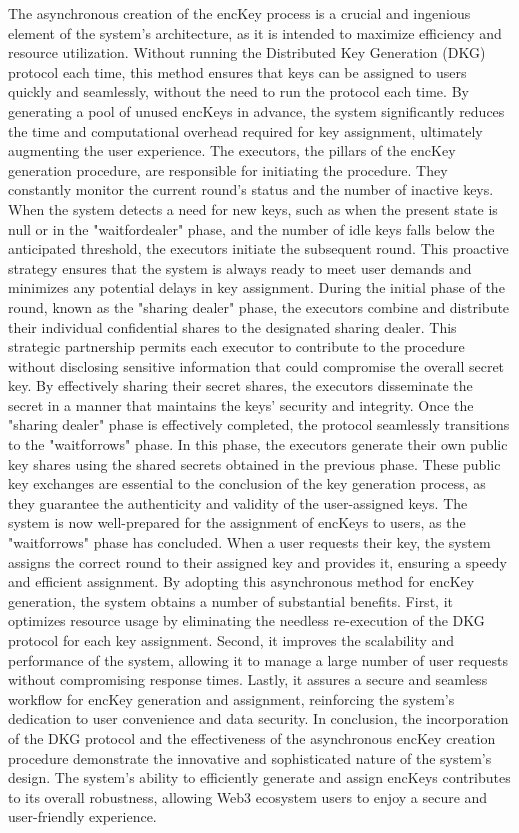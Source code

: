 \documentclass[../Main.tex]{subfiles}
\begin{document}
The asynchronous creation of the encKey process is a crucial and ingenious element of the system's architecture, as it is intended to maximize efficiency and resource utilization. Without running the Distributed Key Generation (DKG) protocol each time, this method ensures that keys can be assigned to users quickly and seamlessly, without the need to run the protocol each time. By generating a pool of unused encKeys in advance, the system significantly reduces the time and computational overhead required for key assignment, ultimately augmenting the user experience. The executors, the pillars of the encKey generation procedure, are responsible for initiating the procedure. They constantly monitor the current round's status and the number of inactive keys. When the system detects a need for new keys, such as when the present state is null or in the "waitfordealer" phase, and the number of idle keys falls below the anticipated threshold, the executors initiate the subsequent round. This proactive strategy ensures that the system is always ready to meet user demands and minimizes any potential delays in key assignment. During the initial phase of the round, known as the "sharing dealer" phase, the executors combine and distribute their individual confidential shares to the designated sharing dealer. This strategic partnership permits each executor to contribute to the procedure without disclosing sensitive information that could compromise the overall secret key. By effectively sharing their secret shares, the executors disseminate the secret in a manner that maintains the keys' security and integrity. Once the "sharing dealer" phase is effectively completed, the protocol seamlessly transitions to the "waitforrows" phase. In this phase, the executors generate their own public key shares using the shared secrets obtained in the previous phase. These public key exchanges are essential to the conclusion of the key generation process, as they guarantee the authenticity and validity of the user-assigned keys. The system is now well-prepared for the assignment of encKeys to users, as the "waitforrows" phase has concluded. When a user requests their key, the system assigns the correct round to their assigned key and provides it, ensuring a speedy and efficient assignment. By adopting this asynchronous method for encKey generation, the system obtains a number of substantial benefits. First, it optimizes resource usage by eliminating the needless re-execution of the DKG protocol for each key assignment. Second, it improves the scalability and performance of the system, allowing it to manage a large number of user requests without compromising response times. Lastly, it assures a secure and seamless workflow for encKey generation and assignment, reinforcing the system's dedication to user convenience and data security. In conclusion, the incorporation of the DKG protocol and the effectiveness of the asynchronous encKey creation procedure demonstrate the innovative and sophisticated nature of the system's design. The system's ability to efficiently generate and assign encKeys contributes to its overall robustness, allowing Web3 ecosystem users to enjoy a secure and user-friendly experience.
\end{document}
